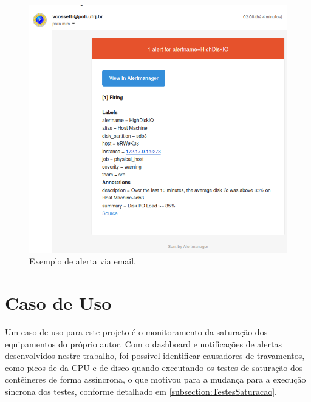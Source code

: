 {\begin{figure}[H]
\centering
\color{red}
\setlength{\abovecaptionskip}{-20pt}
\includegraphics[width=\textwidth]{Imagens/chap04/alerts/alert_email.png}
\caption{Exemplo de alerta via email.}
\label{fig:alert_email}
\end{figure}







}

\section{Caso de Uso}
\label{section:CasosDeUso}

Um caso de uso para este projeto é o monitoramento da saturação dos equipamentos do próprio autor. Com o dashboard e notificações de alertas desenvolvidos nestre trabalho, foi possível identificar causadores de travamentos, como picos de  da CPU e  de disco quando executando os testes de saturação dos contêineres de forma assíncrona, o que motivou para a mudança para a execução síncrona dos testes, conforme detalhado em \ref{subsection:TestesSaturacao}.

